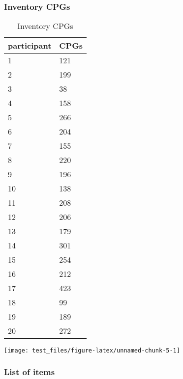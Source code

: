 \documentclass[]{article}
\begin{document}
\subsubsection{Inventory CPGs}\label{inventory-cpgs}

\begin{table}

\caption{\label{tab:unnamed-chunk-4}Inventory CPGs}
\centering
\begin{tabular}[t]{l|l}
\hline
participant & CPGs\\
\hline
\rowcolor{gray!6}  1 & 121\\
\hline
2 & 199\\
\hline
\rowcolor{gray!6}  3 & 38\\
\hline
4 & 158\\
\hline
\rowcolor{gray!6}  5 & 266\\
\hline
6 & 204\\
\hline
\rowcolor{gray!6}  7 & 155\\
\hline
8 & 220\\
\hline
\rowcolor{gray!6}  9 & 196\\
\hline
10 & 138\\
\hline
\rowcolor{gray!6}  11 & 208\\
\hline
12 & 206\\
\hline
\rowcolor{gray!6}  13 & 179\\
\hline
14 & 301\\
\hline
\rowcolor{gray!6}  15 & 254\\
\hline
16 & 212\\
\hline
\rowcolor{gray!6}  17 & 423\\
\hline
18 & 99\\
\hline
\rowcolor{gray!6}  19 & 189\\
\hline
20 & 272\\
\hline
\end{tabular}
\end{table}

\begin{center}\texttt{[image: test\_files/figure-latex/unnamed-chunk-5-1]} \end{center}

\subsubsection{List of items}\label{list-of-items}
\end{document}
